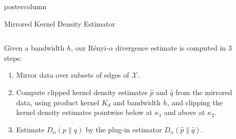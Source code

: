 \documentclass[final,hyperref={pdfpagelabels=false}]{beamer}
\newcommand{\X}{\mathcal{X}}
\newlength{\columnheight}
\begin{document}
\begin{frame}
\begin{columns}
    \begin{column}{.32\textwidth}
      \begin{beamercolorbox}[center,wd=\textwidth]{postercolumn}
        \begin{minipage}[T]{.95\textwidth} %
          \parbox[t][\columnheight]{\textwidth}{ %
            \vfill
            \begin{block}{Mirrored Kernel Density Estimator}
              \begin{columns}
                \begin{column}{.63\textwidth}
                  {\footnotesize
                  Given a bandwidth $h$, our R\'enyi-$\alpha$ divergence
                  estimate is computed in 3 steps:}
                  \begin{enumerate}
                  \item Mirror data over subsets of edges of $\X$.
                  \item Compute clipped kernel density estimates $\hat p$ and
                        $\hat q$ from the mirrored data, using product kernel
                        $K_d$ and bandwidth $h$, and clipping the kernel
                        density estimates pointwise below at $\kappa_1$ and
                        above at $\kappa_2$.
                  \item Estimate $D_\alpha(p\|q)$ by the plug-in estimator
                        $D_\alpha(\hat p\|\hat q)$.
                  \end{enumerate}
                \end{column}
                \begin{column}{.36\textwidth}
                  \begin{figure}[h!]
                    \centering

\end{figure}
\end{column}
\end{columns}
\end{block}}
\end{minipage}
\end{beamercolorbox}
\end{column}
\end{columns}
\end{frame}
\end{document}
